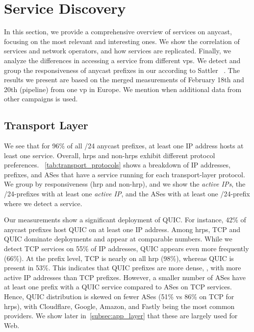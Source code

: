 \section{Service Discovery}\label{sec:results}
In this section, we provide a comprehensive overview of services on anycast, focusing on the most relevant and interesting ones.
We show the correlation of services and network operators, and how services are replicated. 
Finally, we analyze the differences in accessing a service from different \glspl{vp}. 
We detect and group the responsiveness of anycast prefixes in our \dataset according to Sattler \etal~\cite{SattlerEtAl_PackedBrimInvestigating_2023}.
The results we present are based on the merged measurements of February 18th and 20th (pipeline) from one \gls{vp} in Europe. 
We mention when additional data from other campaigns is used.

\subsection{Transport Layer}\label{subsec:transport_layer}

We see that for 96\% of all /24 anycast prefixes, at least one IP address hosts at least one service.
Overall, \glspl{hrp} and non-\glspl{hrp} exhibit different protocol preferences.
~\cref{tab:transport_protocols} shows a breakdown of IP addresses, prefixes, and ASes that have a service running for each transport-layer protocol.
We group by responsiveness (\gls{hrp} and non-\gls{hrp}), and we show the \textit{active IPs}, the /24-prefixes with at least one \textit{active IP}, and the ASes with at least one /24-prefix where we detect a service.

Our measurements show a significant deployment of QUIC.
For instance, 42\% of anycast prefixes host QUIC on at least one IP address.
Among \glspl{hrp}, TCP and QUIC dominate deployments and appear at comparable numbers.
While we detect TCP services on 55\% of IP addresses, QUIC appears even more frequently (66\%).
At the prefix level, TCP is nearly on all \gls{hrp} (98\%), whereas QUIC is present in 53\%.
This indicates that QUIC prefixes are more dense, \ie, with more active IP addresses than TCP prefixes.
However, a smaller number of ASes have at least one prefix with a QUIC service compared to ASes on TCP services.
Hence, QUIC distribution is skewed on fewer ASes (51\% vs 86\% on TCP for \glspl{hrp}), with Cloudflare, Google, Amazon, and Fastly being the most common providers.
We show later in~\cref{subsec:app_layer} that these are largely used for Web.

